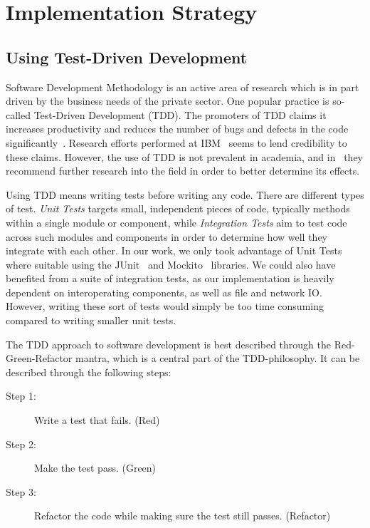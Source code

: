 \section{Implementation Strategy}

\subsection{Using Test-Driven Development}

Software Development Methodology is an active area of research
which is in part driven by the business needs of the private
sector\cite{janzen2005test}. One popular practice is so-called Test-Driven
Development (TDD). The promoters of TDD claims it increases
productivity and reduces the number of bugs and defects in the
code significantly~\cite{beck2003test}. Research
efforts performed at IBM~\cite{maximilien2003assessing} seems to
lend credibility to these claims. However, the use of TDD is not
prevalent in academia, and in~\cite{janzen2005test} they
recommend further research into the field in order to better
determine its effects.

Using TDD means writing tests before writing any code. There are
different types of test. \emph{Unit Tests} targets small,
independent pieces of code, typically methods within a single
module or component, while \emph{Integration Tests} aim to test
code across such modules and components in order to determine
how well they integrate with each other. In our work, we only
took advantage of Unit Tests where suitable using the
JUnit~\cite{junit} and Mockito~\cite{mockito} libraries.
We could also have benefited from a suite of integration tests,
as our implementation is heavily dependent on interoperating
components, as well as file and network IO\@. However, writing
these sort of tests would simply be too time consuming compared
to writing smaller unit tests.

The TDD approach to software development is best described through the
Red-Green-Refactor mantra, which is a central part of the
TDD-philosophy. It can be described through the following steps:

\begin{description}
    \item[Step 1:] Write a test that fails. (Red)
    \item[Step 2:] Make the test pass. (Green)
    \item[Step 3:] Refactor the code while making sure the test
        still passes. (Refactor)
\end{description}

